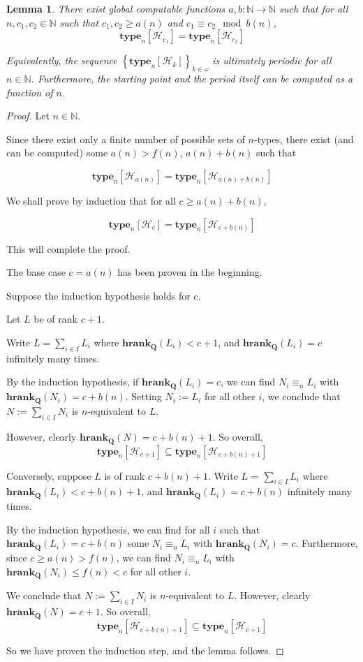 \documentclass{article}
\newtheorem{lemma}{Lemma}
\newcommand{\brackets}[1]{\left[ {#1} \right]}
\newcommand{\braces}[1]{\left\{ {#1} \right\}}
\newcommand{\hrank}[1]{\mathbf{hrank}_{\qq}\left( #1 \right)}
\newcommand{\qq}{\mathbf{Q}}
\newcommand{\NN}{\mathbb{N}}
\newcommand{\type}[2]{\mathbf{type}_{#1} \brackets{#2}}
\begin{document}
\begin{lemma}
  There exist global computable functions $a, b : \NN \to \NN$ such that
  for all $n, c_1, c_2 \in \NN$ such that $c_1, c_2 \ge a(n)$ and $c_1 \equiv c_2 \mod b(n)$,
  $$\type{n}{\mathcal{H}_{c_1}} = \type{n}{\mathcal{H}_{c_2}}$$

  Equivalently, the sequence $\braces{\type{n}{\mathcal{H}_{k}}}_{k \in \omega}$ 
  is ultimately periodic for all $n \in \NN$. Furthermore, the starting point and the period
  itself can be computed as a function of $n$.
\end{lemma}

\begin{proof}
  Let $n \in \NN$.

  Since there exist only a finite number of possible
  sets of $n$-types, there exist (and can be computed)
  some $a(n) > f(n)$, $a(n) + b(n)$ such that
  
  $$\type{n}{\mathcal{H}_{a(n)}} = \type{n}{\mathcal{H}_{a(n) + b(n)}}$$
  
  We shall prove by induction that for all $c \ge a(n) + b(n)$,

  $$\type{n}{\mathcal{H}_{c}} = \type{n}{\mathcal{H}_{c + b(n)}}$$

  This will complete the proof.

  The base case $c = a(n)$ has been proven in the beginning.

  Suppose the induction hypothesis holds for $c$.

  Let $L$ be of rank $c + 1$.

  Write $L = \sum_{i \in I} L_i$ where $\hrank{L_i} < c + 1$,
  and $\hrank{L_i} = c$ infinitely many times.

  By the induction hypothesis,
  if $\hrank{L_i} = c$, we can find $N_i \equiv_n L_i$ with $\hrank{N_i} = c + b(n)$.
  Setting $N_i := L_i$ for all other $i$, we conclude that $N := \sum_{i \in I} N_i$
  is $n$-equivalent to $L$.

  However, clearly $\hrank{N} = c + b(n) + 1$. So overall,
  $$\type{n}{\mathcal{H}_{c + 1}} \subseteq \type{n}{\mathcal{H}_{c + b(n) + 1}}$$

  Conversely, suppose $L$ is of rank $c + b(n) + 1$.
  Write $L$ = $\sum_{i \in I} L_i$ where $\hrank{L_i} < c + b(n) + 1$,
  and $\hrank{L_i} = c + b(n)$ infinitely many times.

  By the induction hypothesis,
  we can find for all $i$ such that $\hrank{L_i} = c + b(n)$ some 
  $N_i \equiv_n L_i$ with $\hrank{N_i} = c$.
  Furthermore, since $c \ge a(n) > f(n)$, we can
  find $N_i \equiv_n L_i$ with $\hrank{N_i} \le f(n) < c$ for all other $i$.

  We conclude that $N := \sum_{i \in I} N_i$ is $n$-equivalent to $L$.
  However, clearly $\hrank{N} = c + 1$. So overall,
  $$\type{n}{\mathcal{H}_{c + b(n) + 1}} \subseteq \type{n}{\mathcal{H}_{c + 1}}$$

  So we have proven the induction step, and the lemma follows.
\end{proof}
\end{document}
